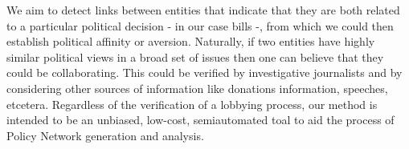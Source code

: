 We aim to detect links between entities that indicate that they are both related to a particular political decision - in our case bills -, from which we could then establish political affinity or aversion. Naturally, if two entities have highly similar political views in a broad set of issues then one can believe that they could be collaborating. This could be verified by investigative journalists and by considering other sources of information like donations information, speeches, etcetera. Regardless of the verification of a lobbying process, our method is intended to be an unbiased, low-cost, semiautomated toal to aid the process of Policy Network generation and analysis. 

